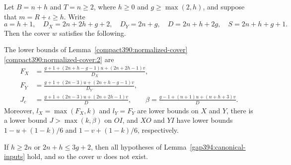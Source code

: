 \begin{lemma}
\label{gap390:bottom-preliminaries}
\label{gap392:bottom-inputs}\label{allbalance377:actual-inputs}
Let $B=n+h$ and $T=n\ge2$, where $h\ge0$ and $g\ge\max(2,h)$, and
suppose that
$m=R+\iota\ge h$. Write
\[
 a=h+1,\quad D_X=2n+2h+g+2,\quad D_Y=2n+g,
 \quad D=2n+h+2g,\quad S=2n+h+g+1.
\]
Then the cover $w$ satisfies the following.
\begin{props}
\item\label{gap390:bottom-preliminaries:1} The lower bounds of Lemma~\ref{compact390:normalized-cover}\ref{compact390:normalized-cover:2} are
\[
\begin{split}
 F_X&=\frac{g+1+(2n+h-g-1)u+(2n+2h-1)v}{D_X},\\
 F_Y&=\frac{g+1+(2n-3)u+(2n+h-g-1)v}{D_Y},\\
 J_c&=\frac{g+1+(2n-3)u+(2n+2h-1)v}{D},\qquad
 \beta=\frac{g-1+(n+1)u+(n+h+3)v}{D}.
\end{split}
\]
Moreover, $l_X=\max(F_X,k)$ and $l_Y=F_Y$
are lower bounds on $X$ and $Y$, there is a lower bound
$J>\max(k,\beta)$ on $OI$, and $XO$ and $YI$ have lower bounds
$1-u+(1-k)/6$ and $1-v+(1-k)/6$, respectively.
\item\label{gap390:bottom-preliminaries:2} If $h\ge2n$ or $2n+h\le3g+2$, then all hypotheses of
Lemma~\ref{gap394:canonical-inputs} hold, and so the cover $w$ does not exist.
\end{props}
\end{lemma}
